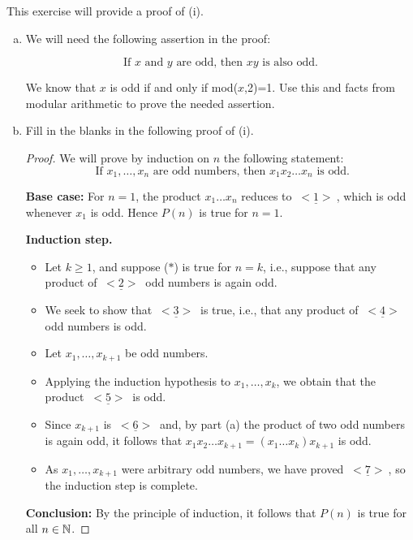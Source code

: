 \begin{exercise}
This exercise will provide a proof of (i).
\begin{enumerate}[(a)]
\item
We will need the following assertion in the proof:

\[ \text{If }x \text{ and } y \text{ are odd, then } xy \text{ is also odd.}\]

We know that $x$ is odd if and only if mod($x$,2)=1.  Use this and facts from modular arithmetic to prove the needed assertion.
\item
Fill in the blanks in the following proof of (i).

\begin{proof}
We will prove by induction on $n$ the following statement: 
\[
\tag{$P(n)$}
\text{ If $x_1,\dots,x_n$ are odd numbers, then 
$x_1x_2\dots x_n$ is odd.}
\]

\noindent
\textbf{Base case:} For $n=1$, the product $x_1\dots x_n$ reduces to 
$\underline{~<1>~}$, which  is odd whenever $x_1$ is odd. 
Hence $P(n)$ is true for $n=1$.

\noindent
\textbf{Induction step.}
\begin{itemize}
\item Let $k\ge 1$, and suppose ($*$) is true for $n=k$, i.e.,
suppose that any product of $\underline{~<2>~}$  odd numbers is again odd.
\item
We seek to show that $\underline{~<3>~}$ is true, i.e., that any product of $\underline{~<4>~}$
odd numbers is odd. 
\item
Let $x_1,\dots,x_{k+1}$ be odd numbers. 
\item
Applying the induction hypothesis to $x_1,\dots,x_k$, we obtain that the
product $\underline{~<5>~}$ is odd. 
\item
Since $x_{k+1}$ is $\underline{~<6>~}$  and, by part (a) the product of two odd numbers is
again odd, it follows that $x_1x_2\dots x_{k+1} = (x_1\dots x_k)x_{k+1}$
is odd.
\item
As $x_1,\dots,x_{k+1}$ were arbitrary odd numbers, we have proved
$\underline{~<7>~}$, so the induction step is complete.
\end{itemize}

\noindent
\textbf{Conclusion:} By the principle of induction, it follows that 
$P(n)$ is true for all $n\in\mathbb{N}$.
\end{proof}
\end{enumerate}
\end{exercise}

